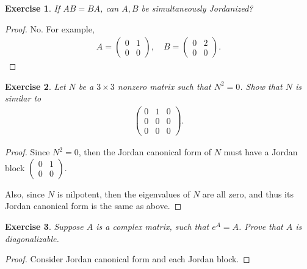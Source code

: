 \documentclass[11pt]{book}
\newtheorem{exercise}{Exercise}[section]
\theoremstyle{definition}
\numberwithin{equation}{chapter}
\begin{document}
\medskip

\begin{exercise}
If $AB = BA$, can $A, B$ be simultaneously Jordanized?
\end{exercise}
\begin{proof}
No. For example, 
\begin{align*}
    A = \begin{pmatrix}
        0 & 1 \\
        0 & 0
    \end{pmatrix}, \quad B = \begin{pmatrix}
        0 & 2 \\
        0 & 0
    \end{pmatrix}.
\end{align*}
\end{proof}


\medskip

\begin{exercise}
Let $N$ be a $3 \times 3$ nonzero matrix such that $N^2 = 0$. Show that $N$ is similar to
\begin{align*}
    \begin{pmatrix}
        0 & 1 & 0 \\
        0 & 0 & 0 \\
        0 & 0 & 0
    \end{pmatrix}.
\end{align*}
\end{exercise}
\begin{proof}
Since $N^2 = 0$, then the Jordan canonical form of $N$ must have a Jordan block $\begin{pmatrix}
    0 & 1 \\
    0 & 0 
\end{pmatrix}$.

Also, since $N$ is nilpotent, then the eigenvalues of $N$ are all zero, and thus its Jordan canonical form is the same as above. 
\end{proof}

\medskip

\begin{exercise}
Suppose $A$ is a complex matrix, such that $e^A = A$. Prove that $A$ is diagonalizable.
\end{exercise}
\begin{proof}
Consider Jordan canonical form and each Jordan block.
\end{proof}

\medskip
\end{document}
